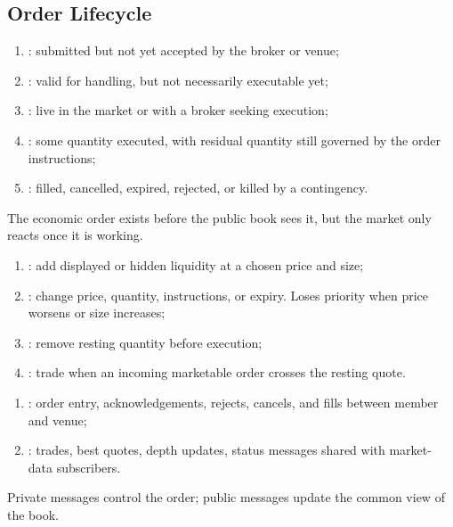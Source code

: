 \subsection{Order Lifecycle}

\begin{process} 
\begin{enumerate}[label=\roman*.]
\setlength{\itemsep}{0pt}
\item {}: submitted but not yet accepted by the broker or venue;
\item {}: valid for handling, but not necessarily executable yet;
\item {}: live in the market or with a broker seeking execution;
\item {}: some quantity executed, with residual quantity still governed by the order instructions;
\item {}: filled, cancelled, expired, rejected, or killed by a contingency.
\end{enumerate}
The economic order exists before the public book sees it, but the market only reacts once it is working.
\end{process}

\begin{process} 
\begin{enumerate}[label=\roman*.]
\setlength{\itemsep}{0pt}
\item {}: add displayed or hidden liquidity at a chosen price and size;
\item {}: change price, quantity, instructions, or expiry. Loses priority when price worsens or size increases;
\item {}: remove resting quantity before execution;
\item {}: trade when an incoming marketable order crosses the resting quote.
\end{enumerate}
\end{process}

\begin{taxonomy} 
\begin{enumerate}[label=\roman*.]
\setlength{\itemsep}{0pt}
\item {}: order entry, acknowledgements, rejects, cancels, and fills between member and venue;
\item {}: trades, best quotes, depth updates, status messages shared with market-data subscribers.
\end{enumerate}
Private messages control the order; public messages update the common view of the book.
\end{taxonomy}

